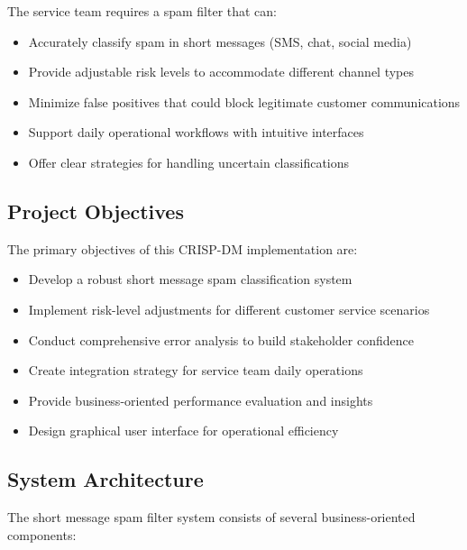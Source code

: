 \documentclass[12pt,a4paper]{article}
\begin{document}
The service team requires a spam filter that can:
\begin{itemize}
    \item Accurately classify spam in short messages (SMS, chat, social media)
    \item Provide adjustable risk levels to accommodate different channel types
    \item Minimize false positives that could block legitimate customer communications
    \item Support daily operational workflows with intuitive interfaces
    \item Offer clear strategies for handling uncertain classifications
\end{itemize}

\subsection{Project Objectives}

The primary objectives of this CRISP-DM implementation are:

\begin{itemize}
    \item Develop a robust short message spam classification system
    \item Implement risk-level adjustments for different customer service scenarios
    \item Conduct comprehensive error analysis to build stakeholder confidence
    \item Create integration strategy for service team daily operations
    \item Provide business-oriented performance evaluation and insights
    \item Design graphical user interface for operational efficiency
\end{itemize}

\subsection{System Architecture}

The short message spam filter system consists of several business-oriented components:
\end{document}
